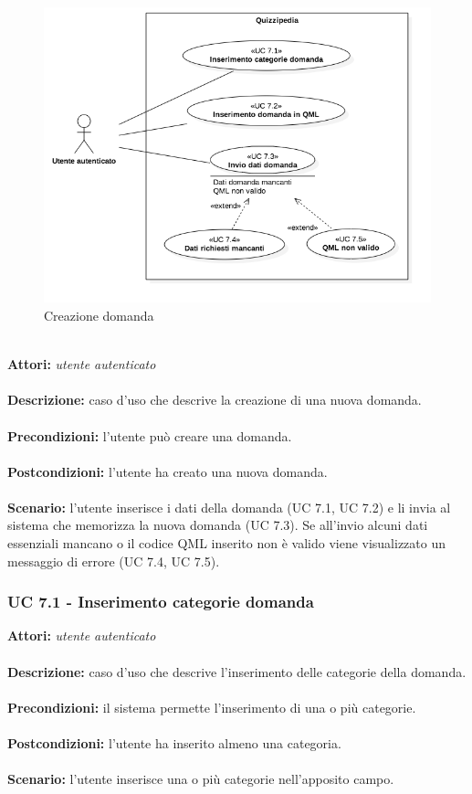 \documentclass[a4paper,11pt]{article}
\begin{document}
\begin{figure}[h!]
\centering
\includegraphics[scale=0.6]{../immagini/UC7.png}
\caption{Creazione domanda}
\end{figure}
\ \\
\textbf{Attori:} \textit{utente autenticato}
\\ \\
\textbf{Descrizione:} caso d'uso che descrive la creazione di una nuova domanda.\\
\\
\textbf{Precondizioni:} l'utente può creare una domanda.\\
\\
\textbf{Postcondizioni:} l’utente ha creato una nuova domanda.\\
\\
\textbf{Scenario:} l’utente inserisce i dati della domanda (UC 7.1, UC 7.2) e li invia al sistema che memorizza la nuova domanda (UC 7.3). Se all'invio alcuni dati essenziali mancano o il codice QML inserito non è valido viene visualizzato un messaggio di errore (UC 7.4, UC 7.5).\\


\subsubsection{UC 7.1 - Inserimento categorie domanda}

\textbf{Attori:} \textit{utente autenticato}
\\ \\
\textbf{Descrizione:} caso d'uso che descrive l'inserimento delle categorie della domanda.\\
\\
\textbf{Precondizioni:} il sistema permette l'inserimento di una o più categorie.\\
\\
\textbf{Postcondizioni:} l’utente ha inserito almeno una categoria.\\
\\
\textbf{Scenario:} l’utente inserisce una o più categorie nell'apposito campo.\\
\end{document}
